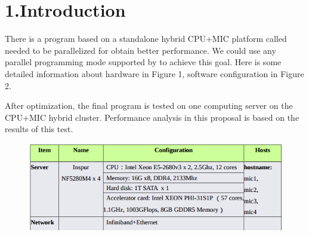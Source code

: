 \documentclass{article}
\begin{document}
\section{1.\hspace*{0.5em}Introduction}\label{sec-introduction}%

\noindent{}There is a program based on a standalone hybrid CPU+MIC platform called  needed to be parallelized for obtain better performance. We could use any parallel programming mode supported by  to achieve this goal. Here is some detailed information about hardware in Figure 1, software configuration in Figure 2.%

After optimization, the final program is tested on one computing server on the CPU+MIC hybrid cluster. Performance analysis in this proposal is based on the results of this test.%

\begin{figure}[tbp]%
\begin{mdcenter}%

\noindent{}\includegraphics[keepaspectratio=true,width=\dimmin{}{\dimwidth{0.90}}]{images/2016-02-18-23-01-13-}{}%

\mdhr{}%

\noindent{}%
\end{mdcenter}\label{fig-myfigure}%
\end{figure}%
\end{document}
